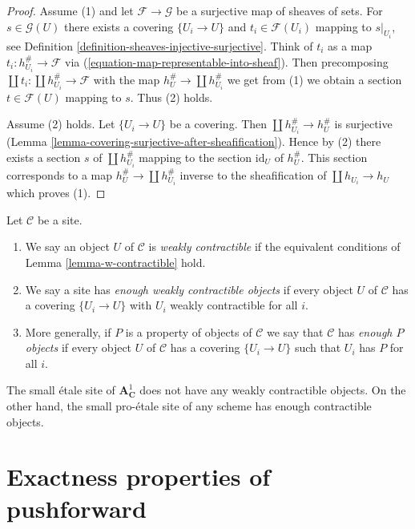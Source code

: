 \begin{proof}
Assume (1) and let $\mathcal{F} \to \mathcal{G}$ be a surjective map of
sheaves of sets. For $s \in \mathcal{G}(U)$ there exists a covering
$\{U_i \to U\}$ and $t_i \in \mathcal{F}(U_i)$ mapping to
$s|_{U_i}$, see Definition \ref{definition-sheaves-injective-surjective}.
Think of $t_i$ as a map $t_i : h_{U_i}^\# \to \mathcal{F}$ via
(\ref{equation-map-representable-into-sheaf}).
Then precomposing $\coprod t_i : \coprod h_{U_i}^\# \to \mathcal{F}$
with the map $h_U^\# \to \coprod h_{U_i}^\#$ we get from (1)
we obtain a section $t \in \mathcal{F}(U)$ mapping to $s$.
Thus (2) holds.

\medskip\noindent
Assume (2) holds. Let $\{U_i \to U\}$ be a covering.
Then $\coprod h_{U_i}^\# \to h_U^\#$ is surjective
(Lemma \ref{lemma-covering-surjective-after-sheafification}).
Hence by (2) there exists a section $s$ of $\coprod h_{U_i}^\#$ mapping
to the section $\text{id}_U$ of $h_U^\#$. This section corresponds to a map
$h_U^\# \to \coprod h_{U_i}^\#$ inverse to the sheafification
of $\coprod h_{U_i} \to h_U$ which proves (1).
\end{proof}

\begin{definition}
\label{definition-w-contractible}
Let $\mathcal{C}$ be a site.
\begin{enumerate}
\item We say an object $U$ of $\mathcal{C}$ is {\it weakly contractible}
if the equivalent conditions of Lemma \ref{lemma-w-contractible} hold.
\item We say a site has {\it enough weakly contractible objects}
if every object $U$ of $\mathcal{C}$ has a covering $\{U_i \to U\}$
with $U_i$ weakly contractible for all $i$.
\item More generally, if $P$ is a property of objects of $\mathcal{C}$
we say that $\mathcal{C}$ has {\it enough $P$ objects} if every object $U$ of
$\mathcal{C}$ has a covering $\{U_i \to U\}$ such that $U_i$ has $P$
for all $i$.
\end{enumerate}
\end{definition}

\noindent
The small \'etale site of $\mathbf{A}^1_\mathbf{C}$ does not have
any weakly contractible objects. On the other hand, the small
pro-\'etale site of any scheme has enough contractible objects.







\section{Exactness properties of pushforward}
\label{section-pushforward}

